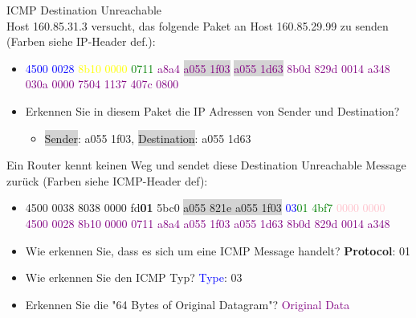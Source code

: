 \begin{example2}{ICMP Destination Unreachable}\\
    Host 160.85.31.3 versucht, das folgende Paket an Host 160.85.29.99 zu senden (Farben siehe IP-Header def.):
    \begin{itemize}
        \item \textcolor{blue}{4500 0028} \textcolor{yellow}{8b10 0000} \textcolor{green}{0711} \textcolor{purple}{a8a4 \colorbox{lightgrey}{a055 1f03} \colorbox{lightgrey}{a055 1d63} 8b0d 829d 0014 a348 030a 0000 7504 1137 407c 0800}
        \item Erkennen Sie in diesem Paket die IP Adressen von Sender und Destination?
        \begin{itemize}
            \item \colorbox{lightgrey}{Sender}: a055 1f03, \colorbox{lightgrey}{Destination}: a055 1d63
        \end{itemize}
    \end{itemize}
    Ein Router kennt keinen Weg und sendet diese Destination Unreachable Message zurück (Farben siehe ICMP-Header def):
    \begin{itemize}
        \item 4500 0038 8038 0000 fd\textbf{01} 5bc0 \colorbox{lightgrey}{a055 821e a055 1f03} \textcolor{blue}{03}\textcolor{green}{01 4bf7} \textcolor{pink}{0000 0000} \textcolor{purple}{4500 0028 8b10 0000 0711 a8a4 a055 1f03 a055 1d63 8b0d 829d 0014 a348}
        \item Wie erkennen Sie, dass es sich um eine ICMP Message handelt? \textbf{Protocol}: 01
        \item Wie erkennen Sie den ICMP Typ? \textcolor{blue}{Type}: 03
        \item Erkennen Sie die "64 Bytes of Original Datagram"? \textcolor{purple}{Original Data}
    \end{itemize}
\end{example2}

